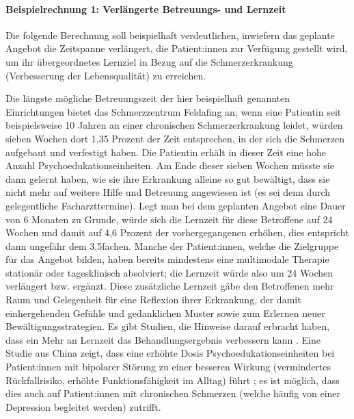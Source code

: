 \documentclass[
  twoside,
  parskip=half-,
  paper=176mm:246mm,
  BCOR=14mm,
  DIV=14,
]{scrreprt}
\begin{document}
\begin{praxis}
  \paragraph{Beispielrechnung 1: Verlängerte Betreuungs- und Lernzeit}
Die folgende Berechnung soll beispielhaft verdeutlichen, inwiefern das geplante Angebot die Zeitspanne verlängert, die Patient:innen zur Verfügung gestellt wird, um ihr übergeordnetes Lernziel in Bezug auf die Schmerzerkrankung (Verbesserung der Lebensqualität) zu erreichen.

Die längste mögliche Betreuungszeit der hier beispielhaft genannten Einrichtungen bietet das Schmerzzentrum Feldafing an; wenn eine Patientin seit beispielsweise 10 Jahren an einer chronischen Schmerzerkrankung leidet, würden sieben Wochen dort 1,35 Prozent der Zeit entsprechen, in der sich die Schmerzen aufgebaut und verfestigt haben. Die Patientin erhält in dieser Zeit eine hohe Anzahl Psychoedukationseinheiten. Am Ende dieser sieben Wochen müsste sie dann gelernt haben, wie sie ihre Erkrankung alleine so gut bewältigt, dass sie nicht mehr auf weitere Hilfe und Betreuung angewiesen ist (es sei denn durch gelegentliche Facharzttermine). Legt man bei dem geplanten Angebot eine Dauer von 6 Monaten zu Grunde, würde sich die Lernzeit für diese Betroffene auf 24 Wochen und damit auf 4,6 Prozent der vorhergegangenen  erhöhen, dies entspricht dann ungefähr dem 3,5fachen. Manche der Patient:innen, welche die Zielgruppe für das Angebot bilden, haben bereits mindestens eine multimodale Therapie stationär oder tagesklinisch absolviert; die Lernzeit würde also um 24 Wochen verlängert bzw. ergänzt. Diese zusätzliche Lernzeit gäbe den Betroffenen mehr Raum und Gelegenheit für eine Reflexion ihrer Erkrankung, der damit einhergehenden Gefühle und gedanklichen Muster sowie zum Erlernen neuer Bewältigungsstrategien. Es gibt Studien, die Hinweise darauf erbracht haben, dass ein Mehr an Lernzeit das Behandlungsergebnis verbessern kann \autocite[vgl. Engers et al. 2008, zit. n.][20]{wachter}. Eine Studie aus China zeigt, dass eine erhöhte Dosis Psychoedukationseinheiten bei Patient:innen mit bipolarer Störung zu einer besseren Wirkung (vermindertes Rückfallrisiko, erhöhte Funktionsfähigkeit im Alltag) führt \autocite[vgl. Chen Chen R. et al. 2019, zit. n.][]{China}; es ist möglich, dass dies auch auf Patient:innen mit chronischen Schmerzen (welche häufig von einer Depression begleitet werden) zutrifft.
\end{praxis}
\end{document}

